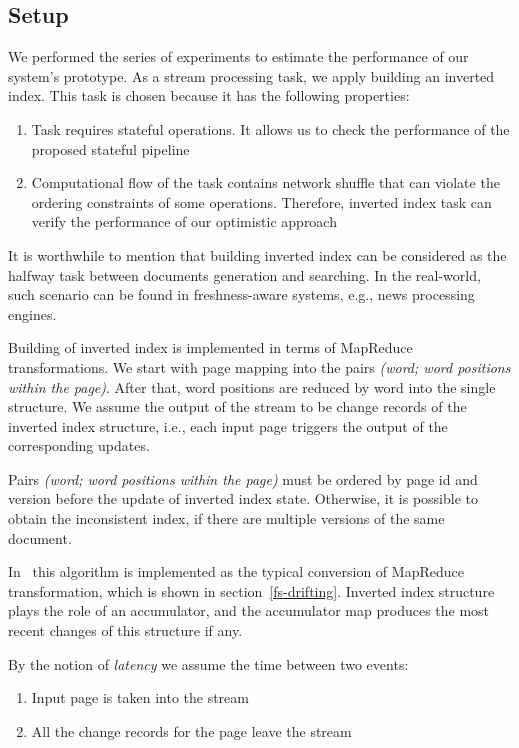 
\label{fs-experiments-section}

\subsection{Setup}
We performed the series of experiments to estimate the performance of our system's prototype. As a stream processing task, we apply building an inverted index. This task is chosen because it has the following properties:

\begin{enumerate}
    \item Task requires stateful operations. It allows us to check the performance of the proposed stateful pipeline
    \item Computational flow of the task contains network shuffle that can violate the ordering constraints of some operations. Therefore, inverted index task can verify the performance of our optimistic approach
\end{enumerate}

It is worthwhile to mention that building inverted index can be considered as the halfway task between documents generation and searching. In the real-world, such scenario can be found in freshness-aware systems, e.g., news processing engines.

Building of inverted index is implemented in terms of MapReduce transformations. We start with page mapping into the pairs {\it (word; word positions within the page)}. After that, word positions are reduced by word into the single structure. We assume the output of the stream to be change records of the inverted index structure, i.e., each input page triggers the output of the corresponding updates. 

Pairs {\it (word; word positions within the page)} must be ordered by page id and version before the update of inverted index state. Otherwise, it is possible to obtain the inconsistent index, if there are multiple versions of the same document.  
 
In \FlameStream\ this algorithm is implemented as the typical conversion of MapReduce transformation, which is shown in section~\ref{fs-drifting}. Inverted index structure plays the role of an accumulator, and the accumulator map produces the most recent changes of this structure if any.

By the notion of {\it latency} we assume the time between two events: 
\begin{enumerate}
    \item Input page is taken into the stream
    \item All the change records for the page leave the stream
\end{enumerate}


